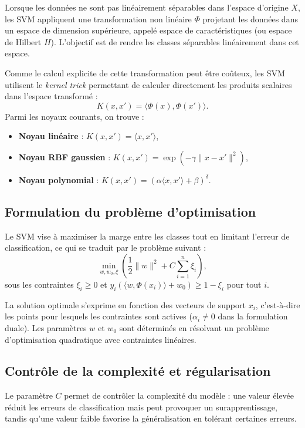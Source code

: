 \documentclass[12pt,a4paper]{report}
\begin{document}
Lorsque les données ne sont pas linéairement séparables dans l’espace d’origine \( X \), les SVM appliquent une transformation non linéaire \( \Phi \) projetant les données dans un espace de dimension supérieure, appelé espace de caractéristiques (ou espace de Hilbert \( H \)). L’objectif est de rendre les classes séparables linéairement dans cet espace.

Comme le calcul explicite de cette transformation peut être coûteux, les SVM utilisent le \textit{kernel trick} permettant de calculer directement les produits scalaires dans l’espace transformé :
\[
K(x, x') = \langle \Phi(x), \Phi(x') \rangle.
\]
Parmi les noyaux courants, on trouve :
\begin{itemize}
    \item \textbf{Noyau linéaire} : \( K(x, x') = \langle x, x' \rangle \),
    \item \textbf{Noyau RBF gaussien} : \( K(x, x') = \exp(-\gamma \| x - x' \|^2) \),
    \item \textbf{Noyau polynomial} : \( K(x, x') = (\alpha \langle x, x' \rangle + \beta)^\delta \).
\end{itemize}

\subsection{Formulation du problème d’optimisation}

Le SVM vise à maximiser la marge entre les classes tout en limitant l’erreur de classification, ce qui se traduit par le problème suivant :
\[
\min_{w, w_0, \xi} \left( \frac{1}{2} \| w \|^2 + C \sum_{i=1}^n \xi_i \right),
\]
sous les contraintes \( \xi_i \geq 0 \) et \( y_i (\langle w, \Phi(x_i) \rangle + w_0) \geq 1 - \xi_i \) pour tout \( i \).

La solution optimale s’exprime en fonction des vecteurs de support \( x_i \), c’est-à-dire les points pour lesquels les contraintes sont actives (\( \alpha_i \neq 0 \) dans la formulation duale). Les paramètres \( w \) et \( w_0 \) sont déterminés en résolvant un problème d’optimisation quadratique avec contraintes linéaires.

\subsection{Contrôle de la complexité et régularisation}

Le paramètre \( C \) permet de contrôler la complexité du modèle : une valeur élevée réduit les erreurs de classification mais peut provoquer un surapprentissage, tandis qu’une valeur faible favorise la généralisation en tolérant certaines erreurs.  
\end{document}
